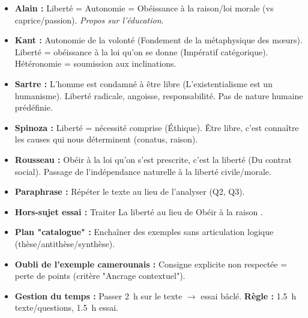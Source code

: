 \documentclass[11pt]{article}
\newcommand{\cle}[1]{{\popxbold\color{popdark}#1}}
\begin{document}
\begin{aretenir}
\begin{itemize}
    \item \textbf{Alain :} \cle{Liberté} = \cle{Autonomie} = Obéissance à la raison/loi morale (vs caprice/passion). \emph{Propos sur l'éducation}.
    \item \textbf{Kant :} \cle{Autonomie de la volonté} (Fondement de la métaphysique des mœurs). Liberté = obéissance à la loi qu'on se donne (\cle{Impératif catégorique}). \cle{Hétéronomie} = soumission aux inclinations.
    \item \textbf{Sartre :} L'homme est condamné à être libre (L'existentialisme est un humanisme). Liberté radicale, angoisse, responsabilité. Pas de nature humaine prédéfinie.
    \item \textbf{Spinoza :} Liberté = nécessité comprise (Éthique). Être libre, c'est connaître les causes qui nous déterminent (\cle{conatus}, raison).
    \item \textbf{Rousseau :} Obéir à la loi qu'on s'est prescrite, c'est la liberté (Du contrat social). Passage de l'indépendance naturelle à la liberté civile/morale.
\end{itemize}
\end{aretenir}

\begin{attention}
\begin{itemize}
    \item \textbf{Paraphrase :} Répéter le texte au lieu de l'analyser (Q2, Q3).
    \item \textbf{Hors-sujet essai :} Traiter \og La liberté \fg au lieu de \og Obéir à la raison \fg.
    \item \textbf{Plan "catalogue" :} Enchaîner des exemples sans articulation logique (thèse/antithèse/synthèse).
    \item \textbf{Oubli de l'exemple camerounais :} Consigne explicite non respectée = perte de points (critère "Ancrage contextuel").
    \item \textbf{Gestion du temps :} Passer \SI{2}{h} sur le texte $\rightarrow$ essai bâclé. \textbf{Règle :} \SI{1,5}{h} texte/questions, \SI{1,5}{h} essai.
\end{itemize}
\end{attention}
\end{document}
